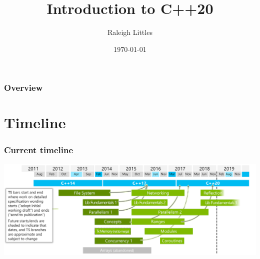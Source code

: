 \documentclass{beamer}
\title[Short title]{Introduction to C++20} %
\author{Raleigh Littles} %
\institute[Karl Storz Imaging] %
{
 \\ %
\medskip
\textit{} %
}
\date{\today} %
\begin{document}
\begin{frame}
\titlepage %
\end{frame}

\begin{frame}
\frametitle{Overview} %
\tableofcontents %
\end{frame}


\section{Timeline} %


\begin{frame}
\frametitle{Current timeline}

\includegraphics[width=\textwidth,height=\textheight,keepaspectratio]{timeline}

\end{frame}
\end{document}
